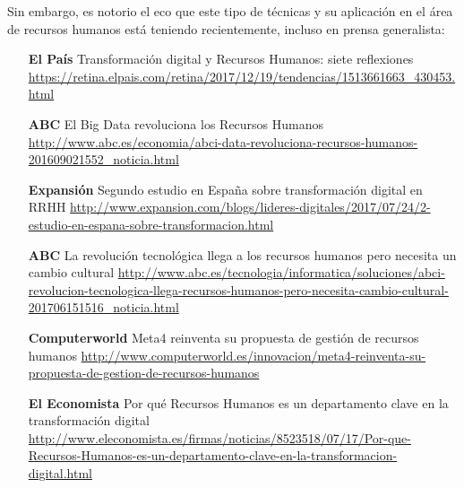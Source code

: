 Sin embargo, es notorio el eco que este tipo de técnicas y su aplicación en el área de 
recursos humanos está teniendo recientemente, incluso en prensa generalista:

\begin{center}

\begin{minipage}{0.75\linewidth}
\begin{itemize}

\item[{\bf El País}] Transformación digital y Recursos Humanos: siete reflexiones \newline
\url{ https://retina.elpais.com/retina/2017/12/19/tendencias/1513661663_430453.html }
\item[{\bf ABC}] El Big Data revoluciona los Recursos Humanos \newline
\url{http://www.abc.es/economia/abci-data-revoluciona-recursos-humanos-201609021552_noticia.html }
\item[{\bf Expansión}] Segundo estudio en España sobre transformación digital en RRHH 
\newline \url{ http://www.expansion.com/blogs/lideres-digitales/2017/07/24/2-estudio-en-espana-sobre-transformacion.html }
\item[{\bf ABC}] La revolución tecnológica llega a los recursos humanos pero necesita un cambio cultural
\newline \url{ http://www.abc.es/tecnologia/informatica/soluciones/abci-revolucion-tecnologica-llega-recursos-humanos-pero-necesita-cambio-cultural-201706151516_noticia.html }
\item[{\bf Computerworld}] Meta4 reinventa su propuesta de gestión de recursos humanos\newline 
\url{ http://www.computerworld.es/innovacion/meta4-reinventa-su-propuesta-de-gestion-de-recursos-humanos }
\item[{\bf El Economista}] Por qué Recursos Humanos es un departamento clave en la transformación digital \newline
\url{ http://www.eleconomista.es/firmas/noticias/8523518/07/17/Por-que-Recursos-Humanos-es-un-departamento-clave-en-la-transformacion-digital.html }
\end{itemize}

\end{minipage}
\end{center}


